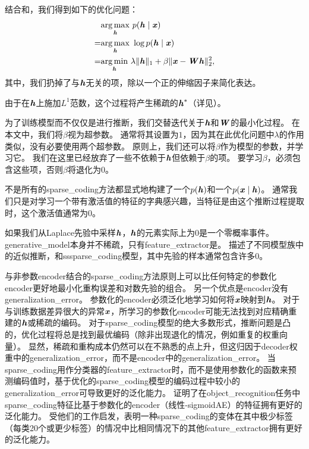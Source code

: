 结合和，我们得到如下的优化问题：
\begin{align}
\label{eqn:1316}
& \underset{\boldsymbol{\mathit{h}}}{\arg\max}\  p(\boldsymbol{\mathit{h}}\mid\boldsymbol{\mathit{x}}) \\
= & \underset{\boldsymbol{\mathit{h}}}{\arg\max}\ \log  p(\boldsymbol{\mathit{h}}\mid\boldsymbol{\mathit{x}})\\
= & \underset{\boldsymbol{\mathit{h}}}{\arg\min}\ \lambda \Vert \boldsymbol{\mathit{h}}\Vert_1 + \beta  \Vert \boldsymbol{\mathit{x}} - \boldsymbol{\mathit{W}} \boldsymbol{\mathit{h}}\Vert_2^2,
\end{align}
其中，我们扔掉了与$\boldsymbol{\mathit{h}}$无关的项，除以一个正的伸缩因子来简化表达。

由于在$\boldsymbol{\mathit{h}}$上施加$L^1$范数，这个过程将产生稀疏的$\boldsymbol{\mathit{h}}^*$（详见）。


为了训练模型而不仅仅是进行推断，我们交替迭代关于$\boldsymbol{\mathit{h}}$和$\boldsymbol{\mathit{W}}$的最小化过程。
在本文中，我们将$\beta$视为超参数。
通常将其设置为$1$，因为其在此优化问题中$\lambda$的作用类似，没有必要使用两个超参数。 
原则上，我们还可以将$\beta$作为模型的参数，并学习它。
我们在这里已经放弃了一些不依赖于$\boldsymbol{\mathit{h}}$但依赖于$\beta$的项。
要学习$\beta$，必须包含这些项，否则$\beta$将退化为$0$。


不是所有的\gls{sparse_coding}方法都显式地构建了一个$p(\boldsymbol{\mathit{h}})$和一个$p(\boldsymbol{\mathit{x}}\mid\boldsymbol{\mathit{h}})$。 
通常我们只是对学习一个带有激活值的特征的字典感兴趣，当特征是由这个推断过程提取时，这个激活值通常为$0$。

如果我们从Laplace先验中采样$\boldsymbol{\mathit{h}}$，$\boldsymbol{\mathit{h}}$的元素实际上为$0$是一个零概率事件。
\gls{generative_model}本身并不稀疏，只有\gls{feature_extractor}是。
\citet{Goodfeli-et-al-TPAMI-Deep-PrePrint-2013-small}描述了不同模型族中的近似推断，和\gls{ss}\gls{sparse_coding}模型，其中先验的样本通常包含许多$0$。

与非参数\gls{encoder}结合的\gls{sparse_coding}方法原则上可以比任何特定的参数化\gls{encoder}更好地最小化重构误差和对数先验的组合。
另一个优点是\gls{encoder}没有\gls{generalization_error}。
参数化的\gls{encoder}必须泛化地学习如何将$\boldsymbol{\mathit{x}}$映射到$\boldsymbol{\mathit{h}}$。
对于与训练数据差异很大的异常$\boldsymbol{\mathit{x}}$，所学习的参数化\gls{encoder}可能无法找到对应精确重建的$\boldsymbol{\mathit{h}}$或稀疏的编码。
对于\gls{sparse_coding}模型的绝大多数形式，推断问题是凸的，优化过程将总是找到最优编码（除非出现退化的情况，例如重复的权重向量）。
显然，稀疏和重构成本仍然可以在不熟悉的点上升，但这归因于\gls{decoder}权重中的\gls{generalization_error}，而不是\gls{encoder}中的\gls{generalization_error}。
当\gls{sparse_coding}用作分类器的\gls{feature_extractor}时，而不是使用参数化的函数来预测编码值时，基于优化的\gls{sparse_coding}模型的编码过程中较小的\gls{generalization_error}可导致更好的泛化能力。
\citet{Coates2011b}证明了在\gls{object_recognition}任务中\gls{sparse_coding}特征比基于参数化的\gls{encoder}（线性-\gls{sigmoid}\gls{AE}）的特征拥有更好的泛化能力。
受他们的工作启发，\citet{Goodfeli-et-al-TPAMI-Deep-PrePrint-2013-small}表明一种\gls{sparse_coding}的变体在其中极少标签（每类20个或更少标签）的情况中比相同情况下的其他\gls{feature_extractor}拥有更好的泛化能力。



